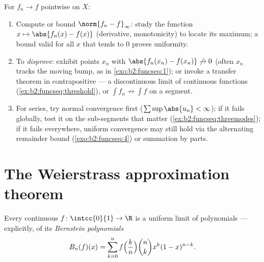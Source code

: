 \begin{method}\label{met:b2:funcseq:uniform}
For $f_n \to f$ pointwise on $X$:
\begin{enumerate}
  \item Compute or bound $\norm{f_n - f}_\infty$: study the
        function $x \mapsto \abs{f_n(x) - f(x)}$ (derivative,
        monotonicity) to locate its maximum; a bound valid for
        all $x$ that tends to $0$ proves uniformity.
  \item To \emph{disprove}: exhibit points $x_n$ with
        $\abs{f_n(x_n) - f(x_n)} \not\to 0$ (often $x_n$ tracks
        the moving bump, as in \cref{exo:b2:funcseq:1}); or
        invoke a transfer theorem in contrapositive --- a
        discontinuous limit of continuous functions
        (\cref{ex:b2:funcseq:threshold}), or $\int f_n
        \not\to \int f$ on a segment.
  \item For series, try normal convergence first
        ($\sum\sup\abs{u_n} < \infty$); if it fails globally,
        test it on the sub-segments that matter
        (\cref{ex:b2:funcseq:threemodes}); if it fails
        everywhere, uniform convergence may still hold via the
        alternating remainder bound
        (\cref{exo:b2:funcseq:4}) or summation by parts.
\end{enumerate}
\end{method}

\section{The Weierstrass approximation theorem}

\begin{theorem}\label{thm:b2:funcseq:weierstrass}
Every continuous $f \colon \intcc{0}{1} \to \R$ is a uniform limit
of polynomials --- explicitly, of its \emph{Bernstein
polynomials}
\[
B_n(f)(x) = \sum_{k=0}^{n} f\Bigl(\frac kn\Bigr)\binom nk x^k
(1-x)^{n-k} .
\]
\end{theorem}

